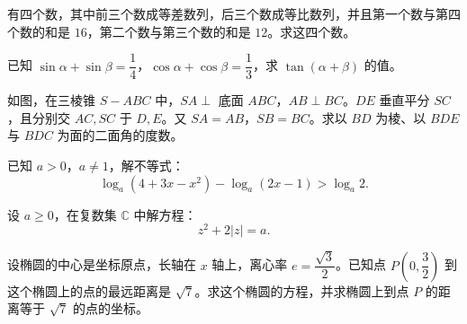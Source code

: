 \begin{question}
有四个数，其中前三个数成等差数列，后三个数成等比数列，并且第一个数与第四个数的和是 $16$，第二个数与第三个数的和是 $12$。求这四个数。

\end{question}
\begin{question}
已知 $\sin\alpha+\sin\beta=\dfrac14$，$\cos\alpha+\cos\beta=\dfrac13$，求 $\tan(\alpha+\beta)$ 的值。

\Needspace{0.4\textheight}
\end{question}
\begin{question}
如图，在三棱锥 $S-ABC$ 中，$SA\perp$ 底面 $ABC$，$AB\perp BC$。$DE$ 垂直平分 $SC$，且分别交 $AC,SC$ 于 $D,E$。又 $SA=AB$，$SB=BC$。求以 $BD$ 为棱、以 $BDE$ 与 $BDC$ 为面的二面角的度数。
\nopagebreak[4]
\begin{center}\end{center}
\nopagebreak[4]
\end{question}
\begin{question}
已知 $a>0$，$a\ne1$，解不等式：
\nopagebreak[4]
\[
\log_a(4+3x-x^2)-\log_a(2x-1)>\log_a2.
\]

\end{question}
\begin{question}
设 $a\ge0$，在复数集 $\mathbb C$ 中解方程：
\nopagebreak[4]
\[
z^2+2|z|=a.
\]

\end{question}
\begingroup
\renewenvironment{question}{\Needspace{0.05\textheight}}{}
\begin{question}
设椭圆的中心是坐标原点，长轴在 $x$ 轴上，离心率 $e=\dfrac{\sqrt3}{2}$。已知点 $P\left(0,\dfrac32\right)$ 到这个椭圆上的点的最远距离是 $\sqrt7$。求这个椭圆的方程，并求椭圆上到点 $P$ 的距离等于 $\sqrt7$ 的点的坐标。



\end{question}
\endgroup